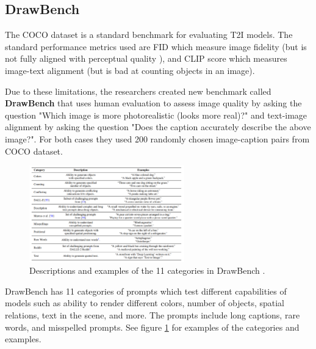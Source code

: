 \subsection{DrawBench}

The COCO dataset \cite{coco_dataset} is a standard benchmark for evaluating T2I models. The standard performance metrics used are FID \cite{fid_score} which measure image fidelity (but is not fully aligned with perceptual quality \cite{perceptual_quality}), and CLIP score \cite{openai_clip} which measures image-text alignment (but is bad at counting objects in an image).

Due to these limitations, the researchers created new benchmark called \textbf{DrawBench} that uses human evaluation to assess image quality by asking the question "Which image is more photorealistic (looks more real)?" and text-image alignment by asking the question "Does the caption accurately describe the above image?". For both cases they used 200 randomly chosen image-caption pairs from COCO dataset.

\begin{figure}
    \centering
    \includegraphics[width=0.6\textwidth]{images/imagen/drawbench_categories.png}
    \caption{Descriptions and examples of the 11 categories in DrawBench \cite{imagen}.}
    \label{fig:imagen_drawbench_categories}
\end{figure}

DrawBench has 11 categories of prompts which test different capabilities of models such as ability to render different colors, number of objects, spatial relations, text in the scene, and more. The prompts include long captions, rare words, and misspelled prompts. See figure \ref{fig:imagen_drawbench_categories} for examples of the categories and examples.














